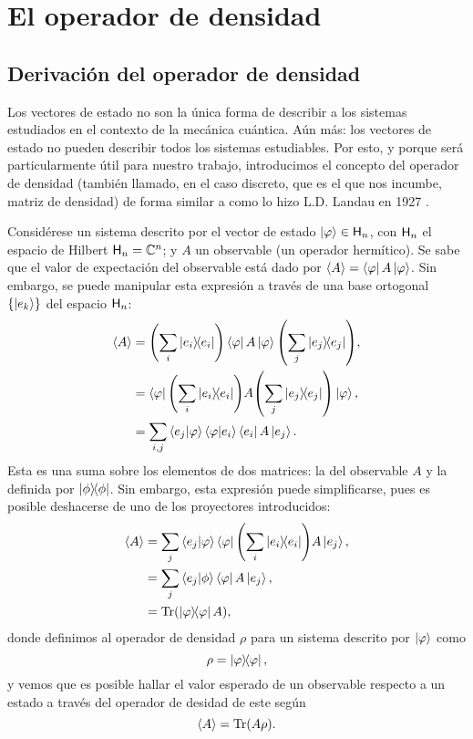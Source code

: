 \section{El operador de densidad}
\subsection{Derivación del operador de densidad}

Los vectores de estado no son la única forma de describir a los sistemas estudiados en el contexto de la mecánica cuántica. Aún más: los vectores de estado no pueden describir todos los sistemas estudiables. Por esto, y porque será particularmente útil para nuestro trabajo, introducimos el concepto del operador de densidad (también llamado, en el caso discreto, que es el que nos incumbe, matriz de densidad) de forma similar a como lo hizo L.D. Landau en 1927 \cite{Landau}.

Considérese un sistema descrito por el vector de estado $\ket{\varphi}\in{\sf H}_{n}$, con ${\sf H}_{n}$ el espacio de Hilbert ${\sf H}_{n}=\mathbb{C}^{n}$; y $A$ un observable (un operador hermítico). Se sabe que el valor de expectación del observable está dado por $\expval{A}=\bra{\varphi}A\ket{\varphi}$. Sin embargo, se puede manipular esta expresión a través de una base ortogonal $\{\ket{e_{k}}\}$ del espacio ${\sf H}_{n}$:
\begin{align*}
\expval{A}&=\qty(\sum_{i}\dyad{e_{i}})\bra{\varphi}A\ket{\varphi}\qty(\sum_{j}\dyad{e_{j}}),\\
&=\bra{\varphi}\qty(\sum_{i}\dyad{e_{i}})A\qty(\sum_{j}\dyad{e_{j}})\ket{\varphi},\\
&=\sum_{i,j}\bra{e_{j}}\ket{\varphi}\bra{\varphi}\ket{e_{i}}\bra{e_{i}}A\ket{e_{j}}.\\
\end{align*}
Esta es una suma sobre los elementos de dos matrices: la del observable $A$ y la definida por $\dyad{\phi}$. 
Sin embargo, esta expresión puede simplificarse, pues es posible deshacerse de uno de los proyectores introducidos:
\begin{align*}
\expval{A}&=\sum_{j}\bra{e_{j}}\ket{\varphi}\bra{\varphi}\qty(\sum_{i}\dyad{e_{i}})A\ket{e_{j}},\\
&=\sum_{j}\bra{e_{j}}\ket{\phi}\bra{\varphi}A\ket{e_{j}},\\
&=\Tr(\dyad{\varphi}A),\\
\end{align*}
donde definimos al operador de densidad $\rho$ para un sistema descrito por $\ket{\varphi}$ como
\begin{equation}\label{eq:DensOpPure}
\rho=\dyad{\varphi},
\end{equation} 
y vemos que es posible hallar el valor esperado de un observable respecto a un estado a través del operador 
de desidad de este según
\begin{equation}\label{eq:ExpValFromDensOp}
\expval{A}=\Tr(A\rho).
\end{equation}

